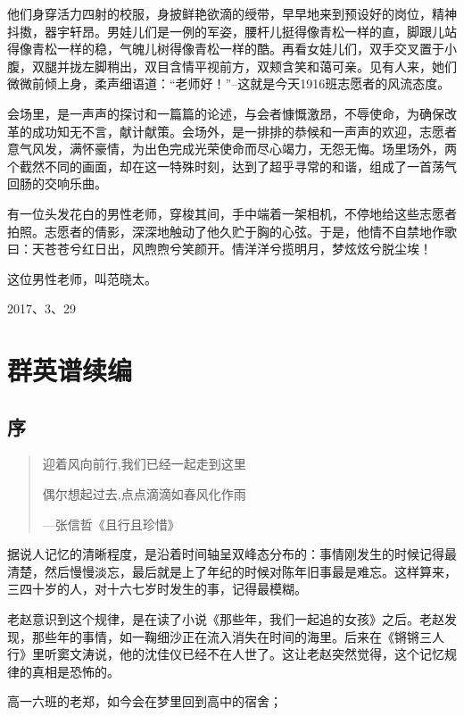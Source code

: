 \documentclass[openany]{ctexbook}
\begin{document}
他们身穿活力四射的校服，身披鲜艳欲滴的绶带，早早地来到预设好的岗位，精神抖擞，器宇轩昂。男娃儿们是一例的军姿，腰杆儿挺得像青松一样的直，脚跟儿站得像青松一样的稳，气魄儿树得像青松一样的酷。再看女娃儿们，双手交叉置于小腹，双腿并拢左脚稍出，双目含情平视前方，双颊含笑和蔼可亲。见有人来，她们微微前倾上身，柔声细语道：``老师好！''--这就是今天1916班志愿者的风流态度。

会场里，是一声声的探讨和一篇篇的论述，与会者慷慨激昂，不辱使命，为确保改革的成功知无不言，献计献策。会场外，是一排排的恭候和一声声的欢迎，志愿者意气风发，满怀豪情，为出色完成光荣使命而尽心竭力，无怨无悔。场里场外，两个截然不同的画面，却在这一特殊时刻，达到了超乎寻常的和谐，组成了一首荡气回肠的交响乐曲。

有一位头发花白的男性老师，穿梭其间，手中端着一架相机，不停地给这些志愿者拍照。志愿者的倩影，深深地触动了他久贮于胸的心弦。于是，他情不自禁地作歌曰：天苍苍兮红日出，风煦煦兮笑颜开。情洋洋兮揽明月，梦炫炫兮脱尘埃！

这位男性老师，叫范晓太。

2017、3、29

\part{群英谱续编}\label{qyp}

\chapter*{序}\label{pre3}

\begin{quote}
迎着风向前行,我们已经一起走到这里

偶尔想起过去,点点滴滴如春风化作雨

\begin{flushright}---张信哲《且行且珍惜》\end{flushright}
\end{quote}

据说人记忆的清晰程度，是沿着时间轴呈双峰态分布的：事情刚发生的时候记得最清楚，然后慢慢淡忘，最后就是上了年纪的时候对陈年旧事最是难忘。这样算来，三四十岁的人，对十六七岁时发生的事，记得最模糊。

老赵意识到这个规律，是在读了小说《那些年，我们一起追的女孩》之后。老赵发现，那些年的事情，如一鞠细沙正在流入消失在时间的海里。后来在《锵锵三人行》里听窦文涛说，他的沈佳仪已经不在人世了。这让老赵突然觉得，这个记忆规律的真相是恐怖的。

高一六班的老郑，如今会在梦里回到高中的宿舍；
\end{document}
